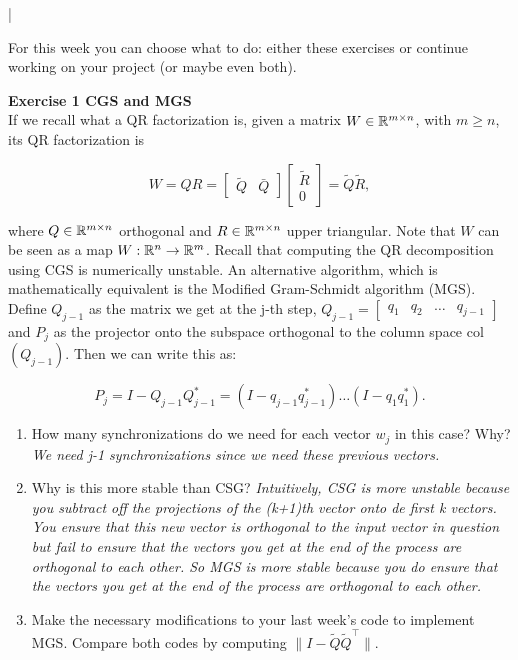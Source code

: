\documentclass[11pt]{article}
\begin{document}
\lstset{frameround=fttt,language=Matlab}

\lstMakeShortInline[columns=fixed]|


For this week you can choose what to do: either these exercises or continue working on your project (or maybe even both). 

{\bf{Exercise 1 CGS and MGS}}\\

If we recall what a QR factorization is, given a matrix $W \in \mathbb{R}^{m \times n}$, with $m \geq n$, its QR factorization is

\[ W = QR = \begin{bmatrix} \tilde{Q} & \bar{Q} \end{bmatrix} \begin{bmatrix} \tilde{R} \\ 0 \end{bmatrix} = \tilde{Q}\tilde{R}, \]

where $Q \in \mathbb{R}^{m \times n}$ orthogonal and $R \in \mathbb{R}^{m \times n}$ upper triangular. Note that $W$ can be seen as a map $W: \mathbb{R}^{n} \to \mathbb{R}^{m}$. Recall that computing the QR decomposition using CGS is numerically unstable. An alternative algorithm, which is mathematically equivalent is the Modified Gram-Schmidt algorithm (MGS). Define $Q_{j-1}$ as the matrix we get at the j-th step, $Q_{j-1} = \begin{bmatrix} q_1 & q_2 & \hdots & q_{j-1} \end{bmatrix}$ and $P_j$ as the projector onto the subspace orthogonal to the column space col$(Q_{j-1})$. Then we can write this as:

\[ P_j = I - Q_{j-1}Q_{j-1}^* = (I - q_{j-1}q_{j-1}^*) \hdots  (I - q_{1}q_{1}^*).\]

\begin{enumerate}
   \item How many synchronizations do we need for each vector $w_j$ in this case? Why? \\
   \textit{We need j-1 synchronizations since we need these previous vectors. }
   \item Why is this more stable than CSG? 
   \textit{Intuitively, CSG is more unstable because you subtract off the projections of the (k+1)th vector onto de first k vectors. You ensure that this new vector is orthogonal to the input vector in question but fail to ensure that the vectors you get at the end of the process are orthogonal to each other. So MGS is more stable because you do ensure that the vectors you get at the end of the process are orthogonal to each other.}
   \item Make the necessary modifications to your last week's code to implement MGS. Compare both codes by computing $\|I - \tilde{Q}\tilde{Q}^\top\|$. 
 
   
\end{enumerate}
\end{document}
